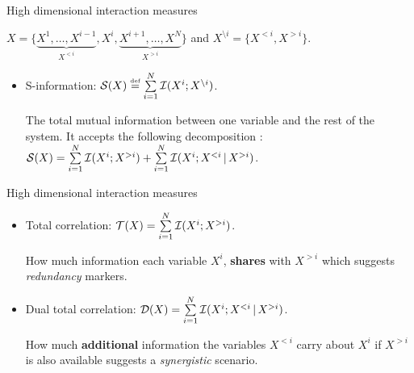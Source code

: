 \documentclass{beamer}
\begin{document}


\begin{frame}{High dimensional interaction measures}

$X = \{ \underbrace{ X^1,\dots,X^{i-1}}_{X^{<i} } ,X^i,\underbrace{X^{i+1},\dots,X^N}_{X^{>i}}  \} $ and $X^{\setminus i}=\{X^{<i},X^{>i}\}$.



\begin{itemize}

\item S-information: $   \mathcal{S}(X) \stackrel{\text{\tiny def}}{=} \sum\limits_{i=1}^N \mathcal{I}(X^i;X^{\setminus i})$.

The total mutual information between one variable and the rest of the system. It accepts the following decomposition : $\mathcal{S}(X)=\sum\limits_{i=1}^N \mathcal{I}(X^i;X^{>i})+\sum\limits_{i=1}^N \mathcal{I}(X^i;X^{<i} \,|\, X^{>i})$.

\end{itemize}
\end{frame}



\begin{frame}{High dimensional interaction measures}
\begin{itemize}

\item Total correlation: $\mathcal{T}(X) = \sum\limits_{i=1}^N \mathcal{I}(X^i;X^{>i})$. 
    
    How much information each variable $X^i$, \textbf{shares} with $ X^{>i}$ which suggests \textit{redundancy} markers.
\item Dual total correlation: $\mathcal{D}( X) = \sum\limits_{i=1}^N \mathcal{I}(X^i;X^{<i} \,|\, X^{>i})$.

How much \textbf{additional} information the variables $X^{<i}$ carry about $X^i$ if  $ X^{>i}$ is also available suggests a \textit{synergistic} scenario.
\end{itemize}
\end{frame}
\end{document}

